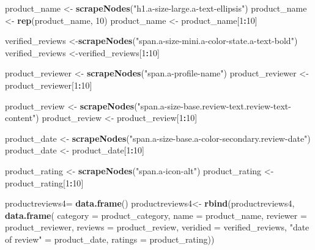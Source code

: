 \documentclass[
]{article}
\newenvironment{Shaded}{\begin{snugshade}}{\end{snugshade}}
\newcommand{\AttributeTok}[1]{\textcolor[rgb]{0.13,0.29,0.53}{#1}}
\newcommand{\DecValTok}[1]{\textcolor[rgb]{0.00,0.00,0.81}{#1}}
\newcommand{\FunctionTok}[1]{\textcolor[rgb]{0.13,0.29,0.53}{\textbf{#1}}}
\newcommand{\NormalTok}[1]{#1}
\newcommand{\OtherTok}[1]{\textcolor[rgb]{0.56,0.35,0.01}{#1}}
\newcommand{\SpecialCharTok}[1]{\textcolor[rgb]{0.81,0.36,0.00}{\textbf{#1}}}
\newcommand{\StringTok}[1]{\textcolor[rgb]{0.31,0.60,0.02}{#1}}
\begin{document}
\begin{Shaded}
\begin{Highlighting}[]
\NormalTok{  product\_name }\OtherTok{\textless{}{-}} \FunctionTok{scrapeNodes}\NormalTok{(}\StringTok{"h1.a{-}size{-}large.a{-}text{-}ellipsis"}\NormalTok{)}
\NormalTok{  product\_name }\OtherTok{\textless{}{-}} \FunctionTok{rep}\NormalTok{(product\_name, }\DecValTok{10}\NormalTok{)}
\NormalTok{  product\_name }\OtherTok{\textless{}{-}}\NormalTok{ product\_name[}\DecValTok{1}\SpecialCharTok{:}\DecValTok{10}\NormalTok{]}
  
\NormalTok{  verified\_reviews }\OtherTok{\textless{}{-}}\FunctionTok{scrapeNodes}\NormalTok{(}\StringTok{"span.a{-}size{-}mini.a{-}color{-}state.a{-}text{-}bold"}\NormalTok{)}
\NormalTok{  verified\_reviews }\OtherTok{\textless{}{-}}\NormalTok{verified\_reviews[}\DecValTok{1}\SpecialCharTok{:}\DecValTok{10}\NormalTok{]}
  
\NormalTok{  product\_reviewer }\OtherTok{\textless{}{-}} \FunctionTok{scrapeNodes}\NormalTok{(}\StringTok{"span.a{-}profile{-}name"}\NormalTok{)}
\NormalTok{  product\_reviewer }\OtherTok{\textless{}{-}}\NormalTok{ product\_reviewer[}\DecValTok{1}\SpecialCharTok{:}\DecValTok{10}\NormalTok{]}
  
\NormalTok{  product\_review }\OtherTok{\textless{}{-}} \FunctionTok{scrapeNodes}\NormalTok{(}\StringTok{"span.a{-}size{-}base.review{-}text.review{-}text{-}content"}\NormalTok{)}
\NormalTok{  product\_review }\OtherTok{\textless{}{-}}\NormalTok{ product\_review[}\DecValTok{1}\SpecialCharTok{:}\DecValTok{10}\NormalTok{]}
  
\NormalTok{  product\_date }\OtherTok{\textless{}{-}} \FunctionTok{scrapeNodes}\NormalTok{(}\StringTok{"span.a{-}size{-}base.a{-}color{-}secondary.review{-}date"}\NormalTok{)}
\NormalTok{  product\_date }\OtherTok{\textless{}{-}}\NormalTok{ product\_date[}\DecValTok{1}\SpecialCharTok{:}\DecValTok{10}\NormalTok{]}
  
\NormalTok{  product\_rating }\OtherTok{\textless{}{-}} \FunctionTok{scrapeNodes}\NormalTok{(}\StringTok{"span.a{-}icon{-}alt"}\NormalTok{)}
\NormalTok{  product\_rating }\OtherTok{\textless{}{-}}\NormalTok{ product\_rating[}\DecValTok{1}\SpecialCharTok{:}\DecValTok{10}\NormalTok{]}
  
\NormalTok{  productreviews4}\OtherTok{=} \FunctionTok{data.frame}\NormalTok{()}
\NormalTok{  productreviews4}\OtherTok{\textless{}{-}} \FunctionTok{rbind}\NormalTok{(productreviews4, }\FunctionTok{data.frame}\NormalTok{(}
                      \AttributeTok{category =}\NormalTok{ product\_category,}
                      \AttributeTok{name =}\NormalTok{ product\_name,}
                      \AttributeTok{reviewer =}\NormalTok{ product\_reviewer,}
                      \AttributeTok{reviews =}\NormalTok{ product\_review,}
                      \AttributeTok{veridied =}\NormalTok{ verified\_reviews,}
                      \StringTok{"date of review"} \OtherTok{=}\NormalTok{ product\_date,}
                      \AttributeTok{ratings =}\NormalTok{ product\_rating))}
  

\end{Highlighting}
\end{Shaded}
\end{document}
